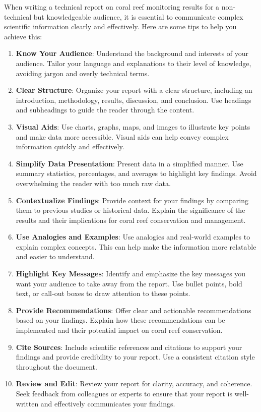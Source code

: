 \documentclass[
  letterpaper,
  DIV=11,
  numbers=noendperiod]{scrartcl}
\begin{document}
When writing a technical report on coral reef monitoring results for a
non-technical but knowledgeable audience, it is essential to communicate
complex scientific information clearly and effectively. Here are some
tips to help you achieve this:

\begin{enumerate}
\def\labelenumi{\arabic{enumi}.}
\item
  \textbf{Know Your Audience}: Understand the background and interests
  of your audience. Tailor your language and explanations to their level
  of knowledge, avoiding jargon and overly technical terms.
\item
  \textbf{Clear Structure}: Organize your report with a clear structure,
  including an introduction, methodology, results, discussion, and
  conclusion. Use headings and subheadings to guide the reader through
  the content.
\item
  \textbf{Visual Aids}: Use charts, graphs, maps, and images to
  illustrate key points and make data more accessible. Visual aids can
  help convey complex information quickly and effectively.
\item
  \textbf{Simplify Data Presentation}: Present data in a simplified
  manner. Use summary statistics, percentages, and averages to highlight
  key findings. Avoid overwhelming the reader with too much raw data.
\item
  \textbf{Contextualize Findings}: Provide context for your findings by
  comparing them to previous studies or historical data. Explain the
  significance of the results and their implications for coral reef
  conservation and management.
\item
  \textbf{Use Analogies and Examples}: Use analogies and real-world
  examples to explain complex concepts. This can help make the
  information more relatable and easier to understand.
\item
  \textbf{Highlight Key Messages}: Identify and emphasize the key
  messages you want your audience to take away from the report. Use
  bullet points, bold text, or call-out boxes to draw attention to these
  points.
\item
  \textbf{Provide Recommendations}: Offer clear and actionable
  recommendations based on your findings. Explain how these
  recommendations can be implemented and their potential impact on coral
  reef conservation.
\item
  \textbf{Cite Sources}: Include scientific references and citations to
  support your findings and provide credibility to your report. Use a
  consistent citation style throughout the document.
\item
  \textbf{Review and Edit}: Review your report for clarity, accuracy,
  and coherence. Seek feedback from colleagues or experts to ensure that
  your report is well-written and effectively communicates your
  findings.
\end{enumerate}
\end{document}

